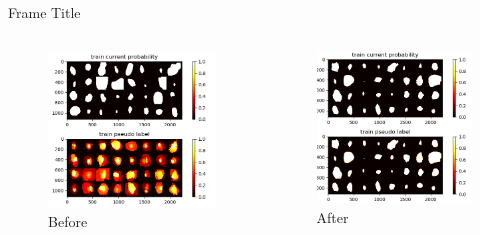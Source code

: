 \begin{frame}{Frame Title}

\begin{columns}
\begin{figure}
    \centering
    \includegraphics[width=1.\textwidth]{images/before.png}
    \caption*{Before}
\end{figure}

\begin{figure}
    \centering
    \includegraphics[width=1.\textwidth]{images/after.png}
    \caption*{After}
\end{figure}
\end{columns}
\end{frame}

